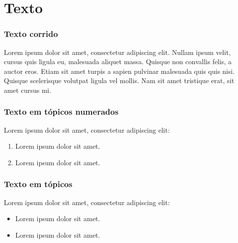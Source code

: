 \section{Texto} %


\begin{frame}
	\frametitle{Texto corrido}
    Lorem ipsum dolor sit amet, consectetur adipiscing elit. Nullam ipsum velit, cursus quis ligula eu, malesuada aliquet massa. Quisque non convallis felis, a auctor eros. Etiam sit amet turpis a sapien pulvinar malesuada quis quis nisi. Quisque scelerisque volutpat ligula vel mollis. Nam sit amet tristique erat, sit amet cursus mi. 
\end{frame}


\begin{frame}
	\frametitle{Texto em tópicos numerados}
     Lorem ipsum dolor sit amet, consectetur adipiscing elit:
    \begin{enumerate}
        \item Lorem ipsum dolor sit amet.
        \item Lorem ipsum dolor sit amet.
    \end{enumerate}
	
\end{frame}


\begin{frame}
	\frametitle{Texto em tópicos}
     Lorem ipsum dolor sit amet, consectetur adipiscing elit:
    \begin{itemize}
        \item Lorem ipsum dolor sit amet.
        \item Lorem ipsum dolor sit amet.
    \end{itemize}
	
\end{frame}



